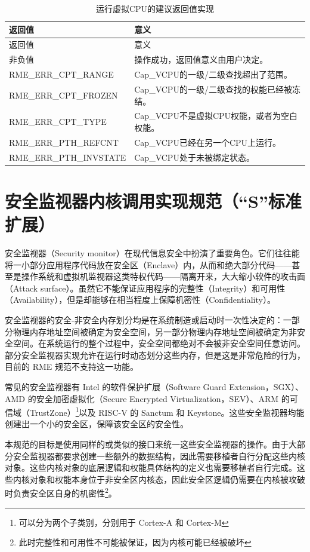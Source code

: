 \begin{xltabular}{\textwidth}{@{}>{\hsize\raggedright\arraybackslash}X>{\hsize\raggedright\arraybackslash}X@{}}
\caption{运行虚拟CPU的建议返回值实现}\label{tab:8-92-run-virtual-cpu-suggested-return-values}\\
\toprule
返回值 & 意义\tabularnewline
\endfirsthead
\toprule
返回值 & 意义\tabularnewline
\midrule
\endhead
\bottomrule
\endlastfoot
    非负值 & 操作成功，返回值意义由用户决定。\tabularnewline
    RME\_ERR\_CPT\_RANGE & Cap\_VCPU的一级/二级查找超出了范围。\tabularnewline
    RME\_ERR\_CPT\_FROZEN & Cap\_VCPU的一级/二级查找的权能已经被冻结。\tabularnewline
    RME\_ERR\_CPT\_TYPE & Cap\_VCPU不是虚拟CPU权能，或者为空白权能。\tabularnewline
    RME\_ERR\_PTH\_REFCNT & Cap\_VCPU已经在另一个CPU上运行。\tabularnewline
    RME\_ERR\_PTH\_INVSTATE & Cap\_VCPU处于未被绑定状态。\tabularnewline
\end{xltabular}

\section{安全监视器内核调用实现规范（``S''标准扩展）}\label{sec:8-security-monitor-kernel-calls}

安全监视器（Security
monitor）在现代信息安全中扮演了重要角色。它们往往能将一小部分应用程序代码放在安全区（Enclave）内，从而和绝大部分代码------甚至是操作系统和虚拟机监视器这类特权代码------隔离开来，大大缩小软件的攻击面（Attack
surface）。虽然它不能保证应用程序的完整性（Integrity）和可用性（Availability），但是却能够在相当程度上保障机密性（Confidentiality）。

安全监视器的安全-非安全内存划分均是在系统制造或启动时一次性决定的：一部分物理内存地址空间被确定为安全空间，另一部分物理内存地址空间被确定为非安全空间。在系统运行的整个过程中，安全空间都绝对不会被非安全空间任意访问。部分安全监视器实现允许在运行时动态划分这些内存，但是这是非常危险的行为，目前的 RME 规范不支持这一功能。

常见的安全监视器有 Intel 的软件保护扩展（Software Guard Extension，SGX）、AMD 的安全加密虚拟化（Secure Encrypted Virtualization，SEV）、ARM 的可信域（TrustZone）\footnote{可以分为两个子类别，分别用于 Cortex-A 和 Cortex-M}以及 RISC-V 的 Sanctum 和 Keystone。这些安全监视器均能创建出一个小的安全区，保障该安全区的安全性。

本规范的目标是使用同样的或类似的接口来统一这些安全监视器的操作。由于大部分安全监视器都要求创建一些额外的数据结构，因此需要移植者自行分配这些内核对象。这些内核对象的底层逻辑和权能具体结构的定义也需要移植者自行完成。这些内核对象和权能本身位于非安全区内核态，因此安全区逻辑仍需要在内核被攻破时负责安全区自身的机密性\footnote{此时完整性和可用性不可能被保证，因为内核可能已经被破坏}。

